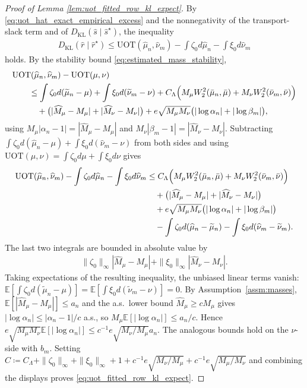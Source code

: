 \documentclass[11pt,reqno]{amsart}
\theoremstyle{definition}
\newcommand{\KL}{\mathrm{KL}}
\renewcommand{\hat}{\widehat}
\renewcommand{\tilde}{\widetilde}
\newcommand{\Ep}{\mathbb{E}}
\begin{document}
\begin{proof}[Proof of Lemma \ref{lem:uot_fitted_row_kl_expect}]
By \eqref{eq:uot_hat_exact_empirical_excess} and the nonnegativity of the transport-slack term and of ${D_\KL}(\hat s\mid \hat s^\star)$, the inequality
\begin{align*}
    {D_\KL}(\hat r\mid \hat r^\star)
    \le
    \mathrm{UOT}(\hat\mu_n,\hat\nu_m)
    - \int \zeta_0 d\hat\mu_n
    - \int \xi_0 d\hat\nu_m
\end{align*}
holds.
By the stability bound \eqref{eq:estimated_mass_stability},
\begin{align*}
&\mathrm{UOT}(\hat\mu_n,\hat\nu_m)-\mathrm{UOT}(\mu,\nu) \\
&\qquad\le
\int \zeta_0 d(\tilde\mu_n-\mu)
+ \int \xi_0 d(\tilde\nu_m-\nu)
+ C_\Lambda\Bigl(
    M_\mu W_2^2(\bar\mu_n,\bar\mu)+M_\nu W_2^2(\bar\nu_m,\bar\nu)
\Bigr) \\
&\qquad\quad
+ \bigl( |\hat M_\mu-M_\mu|+|\hat M_\nu-M_\nu| \bigr)
+ e\sqrt{M_\mu M_\nu}\bigl(|\log\alpha_n|+|\log\beta_m|\bigr),
\end{align*}
using $M_\mu|\alpha_n-1|=|\hat M_\mu-M_\mu|$ and $M_\nu|\beta_m-1|=|\hat M_\nu-M_\nu|$.
Subtracting
\(
\int \zeta_0 d(\hat\mu_n-\mu)+\int \xi_0 d(\hat\nu_m-\nu)
\)
from both sides and using
\(
\mathrm{UOT}(\mu,\nu)=\int \zeta_0 d\mu+\int \xi_0 d\nu
\)
gives
\begin{align*}
    \mathrm{UOT}(\hat\mu_n,\hat\nu_m)
    - \int \zeta_0 d\hat\mu_n
    - \int \xi_0 d\hat\nu_m
    &\le
    C_\Lambda\Bigl(
        M_\mu W_2^2(\bar\mu_n,\bar\mu)+M_\nu W_2^2(\bar\nu_m,\bar\nu)
    \Bigr) \\
    &\quad +
    \bigl( |\hat M_\mu-M_\mu|+|\hat M_\nu-M_\nu| \bigr) \\
    &\quad +
    e\sqrt{M_\mu M_\nu}\bigl(|\log\alpha_n|+|\log\beta_m|\bigr) \\
    &\quad
    - \int \zeta_0 d(\hat\mu_n-\tilde\mu_n)
    - \int \xi_0 d(\hat\nu_m-\tilde\nu_m).
\end{align*}
The last two integrals are bounded in absolute value by
\begin{align*}
    \|\zeta_0\|_\infty |\hat M_\mu-M_\mu|
    +
    \|\xi_0\|_\infty |\hat M_\nu-M_\nu|.
\end{align*}
Taking expectations of the resulting inequality, the unbiased linear terms vanish:
$\Ep[\int\zeta_0 d(\tilde\mu_n-\mu)]=\Ep[\int\xi_0 d(\tilde\nu_m-\nu)]=0$.
By Assumption~\ref{assm:masses}, $\Ep[|\hat M_\mu-M_\mu|]\le a_n$ and the a.s.\ lower bound $\hat M_\mu\ge cM_\mu$ gives $|\log\alpha_n|\le|\alpha_n-1|/c$ a.s., so $M_\mu\Ep[|\log\alpha_n|]\le a_n/c$. Hence
\(
e\sqrt{M_\mu M_\nu} \Ep[|\log\alpha_n|]\le c^{-1}e\sqrt{M_\nu/M_\mu} a_n.
\)
The analogous bounds hold on the $\nu$-side with $b_m$.
Setting
\(
C\coloneqq C_\Lambda
+ \|\zeta_0\|_\infty+\|\xi_0\|_\infty+1
+ c^{-1}e\sqrt{M_\nu/M_\mu}+c^{-1}e\sqrt{M_\mu/M_\nu}
\)
and combining the displays proves \eqref{eq:uot_fitted_row_kl_expect}.
\end{proof}
\end{document}
